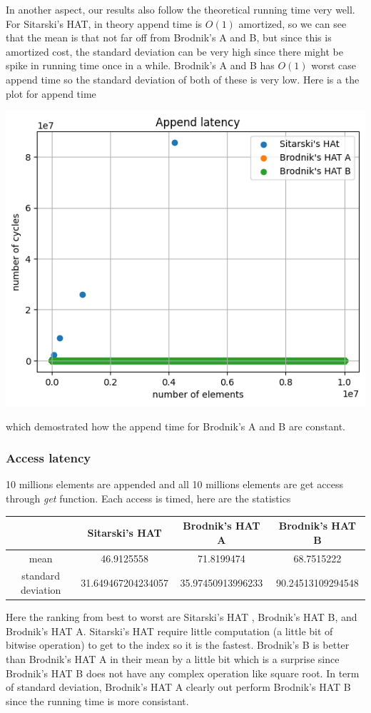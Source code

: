 \documentclass{article} %
\begin{document}
    In another aspect, our results also follow the theoretical running time very well. For Sitarski's HAT, in theory append time is $O(1)$ amortized, so we can see that the mean
    is that not far off from Brodnik's A and B, but since this is amortized cost, the standard deviation can be very high since there might be spike in running time once in a while. Brodnik's A and B has $O(1)$ worst case append time so
    the standard deviation of both of these is very low. Here is a the plot for append time
    \begin{center}
        \includegraphics{graphics/hat_append.png}
    \end{center}
    which demostrated how the append time for Brodnik's A and B are constant.
    \subsubsection*{Access latency}
    10 millions elements are appended and all 10 millions elements are get access through \emph{get} function.
    Each access is timed, here are the statistics
    \begin{center}
        \begin{tabular}{|c|c|c|c|}\hline
            & Sitarski's HAT & Brodnik's HAT A & Brodnik's HAT B\\\hline
            mean &  46.9125558 & 71.8199474 & 68.7515222\\\hline
            standard deviation & 31.649467204234057  & 35.97450913996233 & 90.24513109294548\\\hline 
        \end{tabular}
    \end{center}
    Here the ranking from best to worst are Sitarski's HAT , Brodnik's HAT B, and Brodnik's HAT A. Sitarski's HAT require little
    computation (a little bit of bitwise operation) to get to the index so it is the fastest. Brodnik's B is better than Brodnik's HAT A in
    their mean by a little bit which is a surprise since Brodnik's HAT B does not have any complex operation like square root. In term of standard deviation,
    Brodnik's HAT A clearly out perform Brodnik's HAT B since the running time is more consistant.
\end{document}
